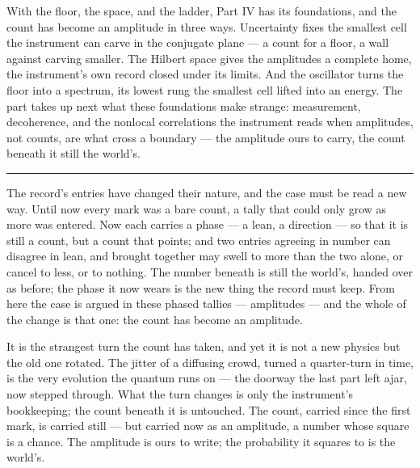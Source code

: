 \bigskip

With the floor, the space, and the ladder, Part IV has its foundations, and the count has become an amplitude
in three ways. Uncertainty fixes the smallest cell the instrument can carve in the conjugate plane --- a count
for a floor, a wall against carving smaller. The Hilbert space gives the amplitudes a complete home, the
instrument's own record closed under its limits. And the oscillator turns the floor into a spectrum, its
lowest rung the smallest cell lifted into an energy. The part takes up next what these foundations make
strange: measurement, decoherence, and the nonlocal correlations the instrument reads when amplitudes, not
counts, are what cross a boundary --- the amplitude ours to carry, the count beneath it still the world's.

\bigskip
\begin{center}
\rule{0.4\textwidth}{0.4pt}
\end{center}
\bigskip

\noindent The record's entries have changed their nature, and the case must be read a new way. Until now every
mark was a bare count, a tally that could only grow as more was entered. Now each carries a phase --- a lean, a
direction --- so that it is still a count, but a count that points; and two entries agreeing in number can
disagree in lean, and brought together may swell to more than the two alone, or cancel to less, or to nothing.
The number beneath is still the world's, handed over as before; the phase it now wears is the new thing the
record must keep. From here the case is argued in these phased tallies --- amplitudes --- and the whole of the
change is that one: the count has become an amplitude.

It is the strangest turn the count has taken, and yet it is not a new physics but the old one rotated. The
jitter of a diffusing crowd, turned a quarter-turn in time, is the very evolution the quantum runs on --- the
doorway the last part left ajar, now stepped through. What the turn changes is only the instrument's
bookkeeping; the count beneath it is untouched. The count, carried since the first mark, is carried still ---
but carried now as an amplitude, a number whose square is a chance. The amplitude is ours to write; the
probability it squares to is the world's.

